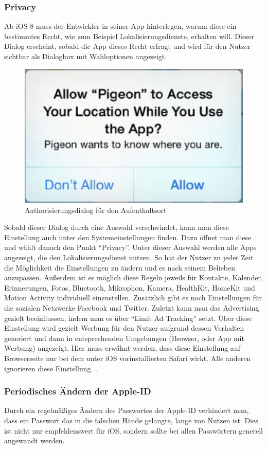 		\subsubsection{Privacy}
			Ab iOS 8 muss der Entwickler in seiner App hinterlegen, warum diese ein
			bestimmtes Recht, wie zum Beispiel Lokalisierungsdienste, erhalten will.
			Dieser Dialog erscheint, sobald die App dieses Recht erfragt und wird für den
			Nutzer sichtbar als Dialogbox mit Wahloptionen angezeigt.
			\begin{figure}[h]
				\centering
				\includegraphics[width=0.4\linewidth]{ios/media/privacy-dialog.jpg}
				\caption{Authorisierungsdialog für den Aufenthaltsort 
				\cite[S.535]{LearnIOS7Dev2013}}
				\label{fig:privacy-dialog}
			\end{figure}
			Sobald dieser Dialog durch eine Auswahl verschwindet, kann man diese
			Einstellung auch unter den Systemeinstellungen finden. Dazu öffnet man diese
			und wählt danach den Punkt "`Privacy"'. Unter dieser Auswahl werden alle Apps
			angezeigt, die den Lokalisierungsdienst nutzen. So hat der Nutzer zu jeder
			Zeit die Möglichkeit die Einstellungen zu ändern und es nach seinem Belieben
			anzupassen. Außerdem ist es möglich diese Regeln jeweils für
			Kontakte, Kalender, Erinnerungen, Fotos, Bluetooth, Mikrophon, Kamera, HealthKit, HomeKit und
			Motion Activity individuell einzustellen. Zusätzlich gibt es noch
			Einstellungen für die sozialen Netzwerke Facebook und Twitter. Zuletzt kann
			man das Advertising gezielt beeinflussen, indem man es über "`Limit Ad
			Tracking"' setzt. Über diese Einstellung wird gezielt Werbung für den Nutzer
			aufgrund dessen Verhalten generiert und dann in entsprechenden Umgebungen
			(Browser, oder App mit Werbung) angezeigt. Hier muss erwähnt werden, dass
			diese Einstellung auf Browserseite nur bei dem unter iOS vorinstallierten
			Safari wirkt. Alle anderen ignorieren diese Einstellung.
			\cite{AppleMngPrivacy2015}\cite[S.131]{IKungFu2014}.
		\subsubsection{Periodisches Ändern der Apple-ID}
			Durch ein regelmäßiges Ändern des Passwortes der Apple-ID verhindert man,
			dass ein Passwort das in die falschen Hände gelangte, lange von Nutzen ist.
			Dies ist nicht nur empfehlenswert für iOS, sondern sollte bei allen
			Passwörtern generell angewandt werden.
